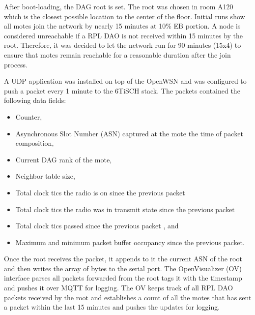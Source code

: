 \documentclass[journal]{IEEEtran}
\begin{document}
After boot-loading, the DAG root is set.
The root was chosen in room A120 which is the closest possible location to the center of the floor.
Initial runs show all motes join the network by nearly 15 minutes at 10\% EB portion.
A node is considered unreachable if a RPL DAO is not received within 15 minutes by the root.
Therefore, it was decided to let the network run for 90 minutes (15x4) to ensure that motes remain reachable for a reasonable duration after the join process. 

A UDP application was installed on top of the OpenWSN and was configured to push a packet every 1 minute to the 6TiSCH stack. 
The packets contained the following data fields:
\begin{itemize}
\item Counter,
\item Asynchronous Slot Number (ASN) captured at the mote the time of packet composition,
\item Current DAG rank of the mote,
\item Neighbor table size,
\item Total clock tics the radio is on since the previous packet
\item Total clock tics the radio was in transmit state since the previous packet
\item Total clock tics passed since the previous packet , and
\item Maximum and minimum packet buffer occupancy since the previous packet.
\end{itemize}
Once the root receives the packet, it appends to it the current ASN of the root and then writes the array of bytes to the serial port.
The OpenVisualizer (OV) interface \cite{munoz19opentestbed} parses all packets forwarded from the root tags it with the timestamp and pushes it over MQTT for logging.
The OV keeps track of all RPL DAO packets received by the root and establishes a count of all the motes that has sent a packet within the last 15 minutes and pushes the updates for logging. 
\end{document}
